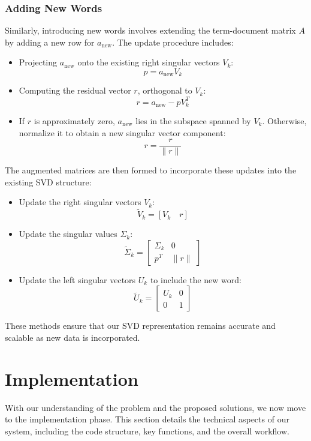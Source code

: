 \documentclass[12pt,a4paper]{article}
\begin{document}
\subsubsection{Adding New Words}
Similarly, introducing new words involves extending the term-document matrix $A$ by adding a new row for $a_{\text{new}}$. The update procedure includes:
\begin{itemize}
    \item Projecting $a_{\text{new}}$ onto the existing right singular vectors $V_k$: 
    \[
    p = a_{\text{new}} V_k
    \]
    \item Computing the residual vector $r$, orthogonal to $V_k$: 
    \[
    r = a_{\text{new}} - p V_k^T
    \]
    \item If $r$ is approximately zero, $a_{\text{new}}$ lies in the subspace spanned by $V_k$. Otherwise, normalize it to obtain a new singular vector component: 
    \[
    r = \frac{r}{\|r\|}
    \]
\end{itemize}
The augmented matrices are then formed to incorporate these updates into the existing SVD structure:
\begin{itemize}
    \item Update the right singular vectors $V_k$:
    \[
    \tilde{V}_k = [V_k \quad r]
    \]
    \item Update the singular values $\Sigma_k$:
    \[
    \tilde{\Sigma}_k = \begin{bmatrix}
    \Sigma_k & 0 \\
    p^T & \|r\|
    \end{bmatrix}
    \]
    \item Update the left singular vectors $U_k$ to include the new word:
    \[
    \tilde{U}_k = \begin{bmatrix}
    U_k & 0 \\
    0 & 1
    \end{bmatrix}
    \]
\end{itemize}
These methods ensure that our SVD representation remains accurate and scalable as new data is incorporated.

\newpage
\section{Implementation}
    With our understanding of the problem and the proposed solutions, we now move to the implementation phase. This section details the technical aspects of our system, including the code structure, key functions, and the overall workflow.
\end{document}

